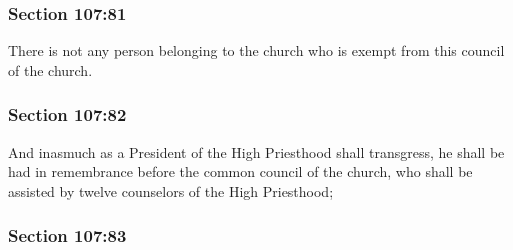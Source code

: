 
	\subsubsection{Section 107:81} %
		\label{DC107-81}

		There is not any person belonging to the church who is exempt from this council of the church.


	\subsubsection{Section 107:82} %
		\label{DC107-82}

		And inasmuch as a President of the High Priesthood shall transgress, he shall be had in remembrance before the common council of the church, who shall be assisted by twelve counselors of the High Priesthood;


	\subsubsection{Section 107:83} %
		\label{DC107-83}

